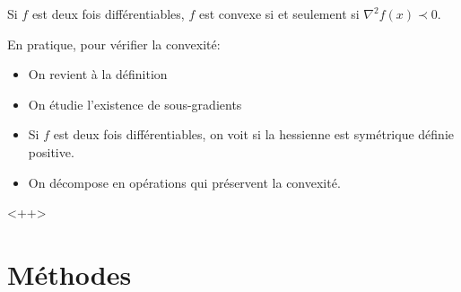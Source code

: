 \documentclass[math]{cours}
\begin{document}
\begin{thm}
	Si $f$ est deux fois différentiables, $f$ est convexe si et seulement si $\nabla^{2}f(x) \prec 0$.
\end{thm}

En pratique, pour vérifier la convexité:
\begin{itemize}
	\item On revient à la définition
	\item On étudie l'existence de sous-gradients
	\item Si $f$ est deux fois différentiables, on voit si la hessienne est symétrique définie positive.
	\item On décompose en opérations qui préservent la convexité.
\end{itemize}<++>

\section{Méthodes}
\end{document}
